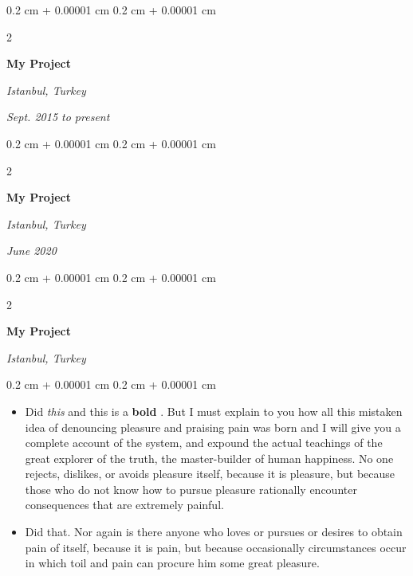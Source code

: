 \documentclass[10pt, letterpaper]{article}
\newenvironment{highlights}{
    \begin{itemize}[
        topsep=0.10 cm,
        parsep=0.10 cm,
        partopsep=0pt,
        itemsep=0pt,
        leftmargin=0.4 cm + 10pt
    ]
}{
    \end{itemize}
} %
\newenvironment{onecolentry}{
    \begin{adjustwidth}{
        0.2 cm + 0.00001 cm
    }{
        0.2 cm + 0.00001 cm
    }
}{
    \end{adjustwidth}
} %
\newenvironment{twocolentry}[2][]{
    \onecolentry
    \def\secondColumn{#2}
    \setcolumnwidth{\fill, 4.5 cm}
    \begin{paracol}{2}
}{
    \switchcolumn \raggedleft \secondColumn
    \end{paracol}
    \endonecolentry
} %
\let\hrefWithoutArrow\href
\renewcommand{\href}[2]{\hrefWithoutArrow{#1}{\mbox{\ifthenelse{\equal{#2}{}}{ }{#2 }\raisebox{.15ex}{\footnotesize \faExternalLink*}}}}
\begin{document}
        \vspace{0.2 cm-3px}

        \begin{twocolentry}{
        \textit{Istanbul, Turkey}    
            
        \textit{Sept. 2015 to present}}
            \textbf{My Project}
        \end{twocolentry}



        \vspace{0.2 cm-3px}

        \begin{twocolentry}{
        \textit{Istanbul, Turkey}    
            
        \textit{June 2020}}
            \textbf{My Project}
        \end{twocolentry}



        \vspace{0.2 cm-3px}

        \begin{twocolentry}{
        \textit{Istanbul, Turkey}    
            
        }
            \textbf{My Project}
        \end{twocolentry}

        \vspace{0.10 cm-3px}
        \begin{onecolentry}
            \begin{highlights}
                \item Did \textit{this} and this is a \textbf{bold} \href{https://example.com}{link}. But I must explain to you how all this mistaken idea of denouncing pleasure and praising pain was born and I will give you a complete account of the system, and expound the actual teachings of the great explorer of the truth, the master-builder of human happiness. No one rejects, dislikes, or avoids pleasure itself, because it is pleasure, but because those who do not know how to pursue pleasure rationally encounter consequences that are extremely painful.
                \item Did that. Nor again is there anyone who loves or pursues or desires to obtain pain of itself, because it is pain, but because occasionally circumstances occur in which toil and pain can procure him some great pleasure.
            \end{highlights}
        \end{onecolentry}
\end{document}
